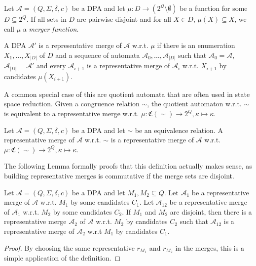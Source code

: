 \begin{defn}
	Let $\mathcal{A} = (Q, \Sigma, \delta, c)$ be a DPA and let $\mu : D \rightarrow (2^\mathcal{Q} \setminus \emptyset)$ be a function for some $D \subseteq 2^Q$. If all sets in $D$ are pairwise disjoint and for all $X \in D$, $\mu(X) \subseteq X$, we call $\mu$ a \emph{merger function}. 
	
	A DPA $\mathcal{A}'$ is a representative merge of $\mathcal{A}$ w.r.t. $\mu$ if there is an enumeration $X_1, \dots, X_{|D|}$ of $D$ and a sequence of automata $\mathcal{A}_0, \dots, \mathcal{A}_{|D|}$ such that $\mathcal{A}_0 = \mathcal{A}$, $\mathcal{A}_{|D|} = \mathcal{A}'$ and every $\mathcal{A}_{i+1}$ is a representative merge of $\mathcal{A}_i$ w.r.t. $X_{i+1}$ by candidates $\mu(X_{i+1})$.
\end{defn}

A common special case of this are quotient automata that are often used in state space reduction. Given a congruence relation $\sim$, the quotient automaton w.r.t. $\sim$ is equivalent to a representative merge w.r.t. $\mu : \mathfrak{C}(\sim) \rightarrow 2^Q, \kappa \mapsto \kappa$.

\begin{lem}
	Let $\mathcal{A} = (Q, \Sigma, \delta, c)$ be a DPA and let $\sim$ be an equivalence relation. A representative merge of $\mathcal{A}$ w.r.t. $\sim$ is a representative merge of $\mathcal{A}$ w.r.t. $\mu : \mathfrak{C}(\sim) \rightarrow 2^Q, \kappa \mapsto \kappa$.
\end{lem}

\vspace{5pt}

The following Lemma formally proofs that this definition actually makes sense, as building representative merges is commutative if the merge sets are disjoint.

\begin{lem}
	Let $\mathcal{A} = (Q, \Sigma, \delta, c)$ be a DPA and let $M_1, M_2 \subseteq Q$. Let $\mathcal{A}_1$ be a representative merge of $\mathcal{A}$ w.r.t. $M_1$ by some candidates $C_1$. Let $\mathcal{A}_{12}$ be a representative merge of $\mathcal{A}_1$ w.r.t. $M_2$ by some candidates $C_2$. If $M_1$ and $M_2$ are disjoint, then there is a representative merge $\mathcal{A}_2$ of $\mathcal{A}$ w.r.t. $M_2$ by candidates $C_2$ such that $\mathcal{A}_{12}$ is a representative merge of $\mathcal{A}_2$ w.r.t $M_1$ by candidates $C_1$.
\end{lem}

\begin{proof}
	By choosing the same representative $r_{M_1}$ and $r_{M_2}$ in the merges, this is a simple application of the definition.
\end{proof}

